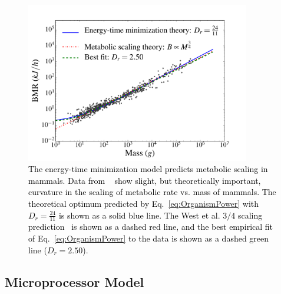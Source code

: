 \documentclass[12pt]{article}
\newcommand{\red}[1]{\textcolor{black}{#1}}
\begin{document}
 
\begin{figure}[!h] \centering
  \includegraphics[height=70mm]{Figures/OrganismsPowerScalingv2.pdf}

  \caption{\red{The energy-time minimization model predicts metabolic
    scaling in mammals. Data from ~\cite{kolokotrones2010curvature}
    show slight, but theoretically important, curvature in the scaling of metabolic rate vs. mass of mammals.  The  theoretical optimum predicted by Eq.~\ref{eq:OrganismPower}
    with $D_r = \frac{24}{11}$ is shown as a solid blue line. The West et
    al. $3/4$ scaling prediction~\cite{west97} is shown as a dashed red line, and the best empirical fit of Eq.~\ref{eq:OrganismPower} to the data is
    shown as a dashed green line ($D_r = 2.50$).}}
\label{fig:OrganismsPowerScaling}
\end{figure}



\subsection{Microprocessor Model}
\label{sec:computers}
\end{document}
